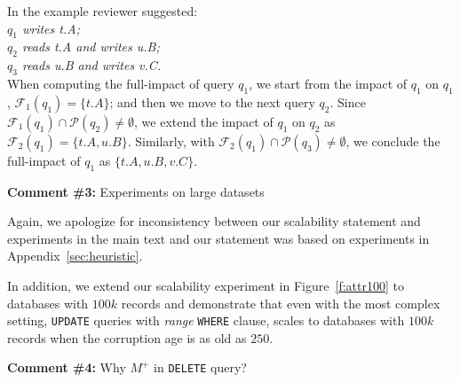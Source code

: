 \noindent In the example reviewer suggested:\\
\textit{\indent $q_1$ writes t.A; \\
\indent $q_2$ reads t.A and writes u.B; \\
\indent $q_3$ reads u.B and writes v.C.}\\
When computing the full-impact of query $q_1$, we start from the impact of $q_1$
on $q_1$, $\mathcal{F}_1(q_1) = \{t.A\}$; and then we move to the next query $q_2$. 
Since $\mathcal{F}_1(q_1)  \cap\mathcal{P}(q_2) \neq \emptyset$, we extend the impact 
of $q_1$ on $q_2$ as $\mathcal{F}_2(q_1) = \{t.A, u.B\}$. Similarly, with 
$\mathcal{F}_2(q_1)  \cap\mathcal{P}(q_3) \neq \emptyset$, we conclude the full-impact
of $q_1$ as $\{t.A, u.B, v.C\}$.


\comskip

\noindent
\textbf{Comment \#3:} Experiments on large datasets
\begin{quote}
\end{quote}

Again, we apologize for inconsistency between our scalability statement and
experiments in the main text and our statement was based on experiments in
Appendix~\ref{sec:heuristic}.

In addition, we extend our scalability experiment in Figure~\ref{f:attr100} to
databases with $100k$ records and demonstrate that even with the most complex
setting, \texttt{UPDATE} queries with \textit{range} \texttt{WHERE} clause,
\sys scales to databases with $100k$ records when the corruption age is as old
as $250$.



\comskip

\noindent
\textbf{Comment \#4:} Why $M^+$ in \texttt{DELETE} query?
\begin{quote}
\end{quote}

